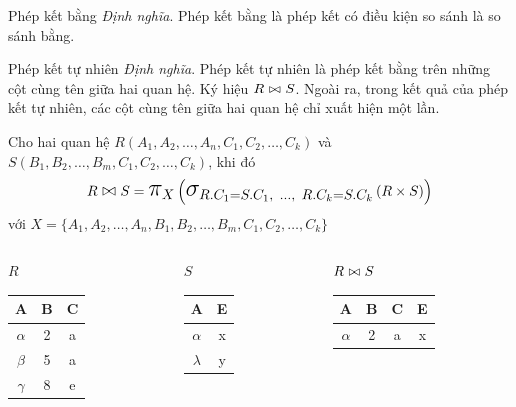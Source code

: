 \documentclass[11pt, handout]{beamer}
\newcommand{\mmm}[1]{\mathlarger{\mathlarger{\mathlarger#1}}}%
\newcommand{\ppi}[2]{\mmm{\pi}_{#1}\left(#2\right)}%
\newcommand{\psig}[2]{\mmm{\sigma}_{#1}\left(#2\right)}%
\begin{document}
  \begin{frame}{Phép kết bằng}
    \textit{Định nghĩa}. Phép kết bằng là phép kết có điều kiện so sánh là so sánh bằng.
  \end{frame}
  \begin{frame}{Phép kết tự nhiên}
    \textit{Định nghĩa}. Phép kết tự nhiên là phép kết bằng trên những cột cùng tên giữa hai quan hệ.
    Ký hiệu $R \join S$. Ngoài ra, trong kết quả của phép kết tự nhiên, các cột cùng tên giữa hai quan hệ
    chỉ xuất hiện một lần.
  \end{frame}
  \begin{frame}
    Cho hai quan hệ $R(A_1, A_2, \dots,A_n, C_1, C_2, \dots, C_k)$ và $S(B_1, B_2, \dots, B_m, C_1, C_2, \dots, C_k)$,
    khi đó
    $$
    R \join S = \ppi{X}{\psig{R.C_1 = S.C_1,\ \dots,\ R.C_k = S.C_k}{R \times S}}
    $$
    với $X = \{A_1, A_2, \dots,A_n, B_1, B_2, \dots, B_m, C_1, C_2, \dots, C_k\}$
  \end{frame}
  \begin{frame}
    \begin{columns}[T]
      \begin{column}{0.3\textwidth}
        \centering $R$
        \medskip \\
        \begin{tabular}{|c|c|c|}
          \hline
          \textbf{A} & \textbf{B} & \textbf{C}  \\[0.5ex] \hline\hline
          $\alpha$ & 2 & a\\ \hline
          $\beta$ & 5 & a\\ \hline
          $\gamma$ & 8 & e\\ \hline
        \end{tabular}
      \end{column}
      \begin{column}{0.3\textwidth}
        \centering $S$
        \medskip \\
        \begin{tabular}{|c|c|}
          \hline
          \textbf{A} & \textbf{E} \\[0.5ex] \hline\hline
          $\alpha$ & x\\ \hline
          $\lambda$ & y\\ \hline
        \end{tabular}
      \end{column}
      \begin{column}{0.3\textwidth}
        \centering $R \join S$
        \medskip \\
        \begin{tabular}{|c|c|c|c|}
          \hline
          \textbf{A} & \textbf{B} & \textbf{C} & \textbf{E}\\[0.5ex] \hline\hline
          $\alpha$ & 2 & a & x \\ \hline
        \end{tabular}
      \end{column}
    \end{columns}
  \end{frame}
\end{document}
